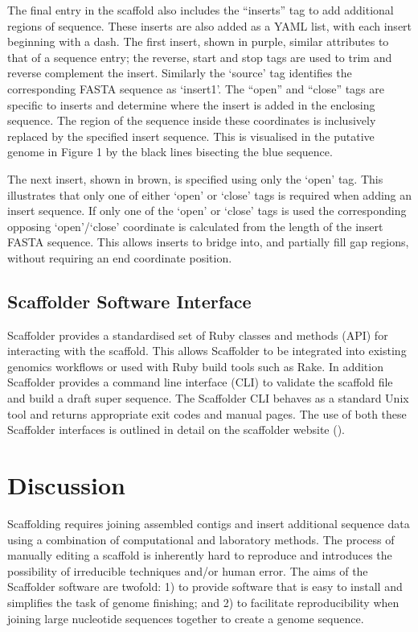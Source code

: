 \documentclass[10pt]{bmc_article}
\newenvironment{bmcformat}{\begin{raggedright}\baselineskip20pt\sloppy\setboolean{publ}{false}}{\end{raggedright}\baselineskip20pt\sloppy}
\begin{document}
\begin{bmcformat}
The final entry in the scaffold also includes the ``inserts'' tag to add
additional regions of sequence. These inserts are also added as a YAML list,
with each insert beginning with a dash. The first insert, shown in purple,
similar attributes to that of a sequence entry; the reverse, start and stop
tags are used to trim and reverse complement the insert. Similarly the `source'
tag identifies the corresponding FASTA sequence as `insert1'. The ``open'' and
``close'' tags are specific to inserts and determine where the insert is added
in the enclosing sequence. The region of the sequence inside these coordinates
is inclusively replaced by the specified insert sequence. This is visualised in
the putative genome in Figure 1 by the black lines bisecting the blue sequence.
\pb

The next insert, shown in brown, is specified using only the `open' tag. This
illustrates that only one of either `open' or `close' tags is required when
adding an insert sequence. If only one of the `open' or `close' tags is used
the corresponding opposing `open'/`close' coordinate is calculated from the
length of the insert FASTA sequence. This allows inserts to bridge into, and
partially fill gap regions, without requiring an end coordinate position. \pb

\subsection*{Scaffolder Software Interface} %

Scaffolder provides a standardised set of Ruby classes and methods (API) for
interacting with the scaffold. This allows Scaffolder to be integrated into
existing genomics workflows or used with Ruby build tools such as Rake. In
addition Scaffolder provides a command line interface (CLI) to validate the
scaffold file and build a draft super sequence. The Scaffolder CLI behaves as
a standard Unix tool and returns appropriate exit codes and manual pages. The
use of both these Scaffolder interfaces is outlined in detail on the scaffolder
website (\scaffolder). \pb

\section*{Discussion} %

Scaffolding requires joining assembled contigs and insert additional sequence
data using a combination of computational and laboratory methods. The process
of manually editing a scaffold is inherently hard to reproduce and introduces
the possibility of irreducible techniques and/or human error. The aims of
the Scaffolder software are twofold: 1) to provide software that is easy to
install and simplifies the task of genome finishing; and 2) to facilitate
reproducibility when joining large nucleotide sequences together to create
a genome sequence. \pb


\end{bmcformat}
\end{document}
